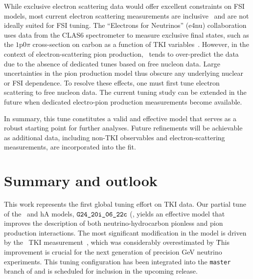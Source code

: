 While exclusive electron scattering data would offer excellent constraints on FSI models, most current electron scattering measurements are inclusive~\cite{electronsforneutrinos:2020tbf} and are not ideally suited for FSI tuning.
The ``Electrons for Neutrinos'' (e4nu) collaboration uses data from the CLAS6 spectrometer to measure exclusive final states, such as the $1\textrm{p}0\pi$ cross-section on carbon as a function of TKI variables~\cite{CLAS:2021neh}.
However, in the context of electron-scattering pion production, \genie\ tends to over-predict the data due to the absence of dedicated tunes based on free nucleon data. 
Large uncertainties in the pion production model thus obscure any underlying nuclear or FSI dependence. 
To resolve these effects, one must first tune electron scattering to free nucleon data. 
The current tuning study can be extended in the future when dedicated electro-pion production measurements become available.

In summary, this tune constitutes a valid and effective model that serves as a robust starting point for further analyses. 
Future refinements will be achievable as additional data, including non-TKI observables and electron-scattering measurements, are incorporated into the fit.

\section{\label{sec:summary}Summary and outlook}
This work represents the first global tuning effort on TKI data. 
Our partial tune of the \sfcfg\ and hA models, $\texttt{G24\_20i\_06\_22c}$ (\gC\), yields an effective model that improves the description of both neutrino-hydrocarbon pionless and pion production interactions. 
The most significant modification in the model is driven by the \minpiz\ TKI measurement~\cite{MINERvA:2020anu}, which was considerably overestimated by \genie\. 
This improvement is crucial for the next generation of precision GeV neutrino experiments. 
This tuning configuration has been integrated into the \texttt{master} branch of \genie and is scheduled for inclusion in the upcoming release.


